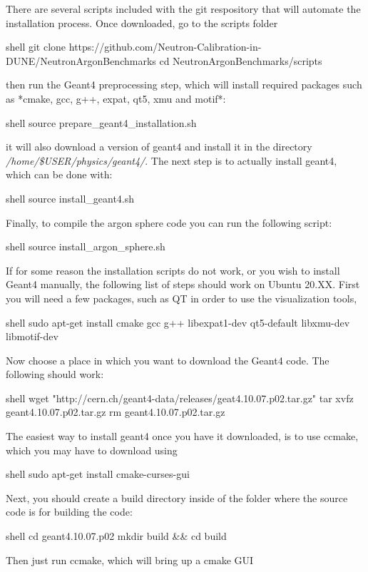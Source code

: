 \documentclass[8pt]{refart}
\begin{document}
 There are several scripts included with the git respository that will automate the installation process.  Once downloaded, go to the scripts folder
\begin{code}{shell}
git clone https://github.com/Neutron-Calibration-in-DUNE/NeutronArgonBenchmarks
cd NeutronArgonBenchmarks/scripts
\end{code}
then run the Geant4 preprocessing step, which will install required packages such as *cmake, gcc, g++, expat, qt5, xmu and motif*:
\begin{code}{shell}
source prepare_geant4_installation.sh
\end{code}
it will also download a version of geant4 and install it in the directory \textit{/home/\$USER/physics/geant4/}.  The next step is to actually install geant4, which can be done with:
\begin{code}{shell}
source install\_geant4.sh
\end{code}
Finally, to compile the argon sphere code you can run the following script:
\begin{code}{shell}
source install_argon_sphere.sh
\end{code}
 If for some reason the installation scripts do not work, or you wish to install Geant4 manually, the following list of steps should work on Ubuntu 20.XX.  First you will need a few packages, such as QT in order to use the visualization tools,
\begin{code}{shell}
  sudo apt-get install cmake gcc g++ libexpat1-dev qt5-default libxmu-dev libmotif-dev
\end{code}
Now choose a place in which you want to download the Geant4 code.  The following should work:
\begin{code}{shell}
  wget "http://cern.ch/geant4-data/releases/geat4.10.07.p02.tar.gz"
  tar xvfz geant4.10.07.p02.tar.gz
  rm geant4.10.07.p02.tar.gz
\end{code}
The easiest way to install geant4 once you have it downloaded, is to use ccmake, which you may have to download using
\begin{code}{shell}
  sudo apt-get install cmake-curses-gui
\end{code}
Next, you should create a build directory inside of the folder where the source code is for building the code:
\begin{code}{shell}
  cd geant4.10.07.p02
  mkdir build && cd build
\end{code}
Then just run ccmake, which will bring up a cmake GUI
\end{document}
